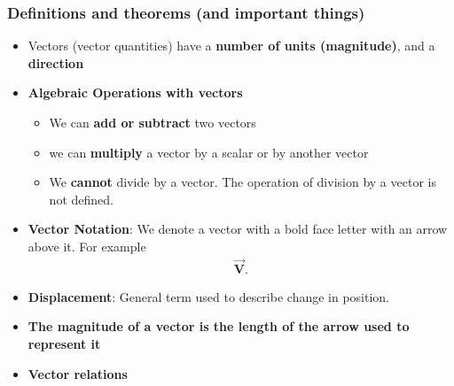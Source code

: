 \documentclass{report}
\begin{document}
    \pagebreak 
    \subsubsection{Definitions and theorems (and important things)}
    \begin{itemize}
        \item Vectors (vector quantities) have a \textbf{number of units (magnitude)}, and a \textbf{direction}
        \item \textbf{Algebraic Operations with vectors}
            \begin{itemize}
                \item We can \textbf{add or subtract} two vectors
                \item we can \textbf{multiply} a vector by a scalar or by another vector
                \item We \textbf{cannot} divide by a vector. The operation of division by a vector is not defined.
            \end{itemize}
        \item \textbf{Vector Notation}: We denote a vector with a bold face letter with an arrow above it. For example
            \begin{align*}
                \vec{\textbf{V}}
            .\end{align*}
        \item \textbf{Displacement}: General term used to describe change in position.
        \item \textbf{The magnitude of a vector is the length of the arrow used to represent it}

        \item \textbf{Vector relations}


\end{itemize}
\end{document}
